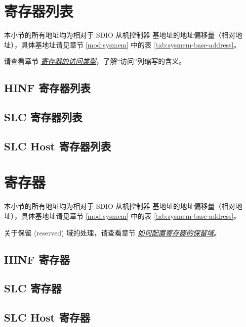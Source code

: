 \documentclass[main\_\_CN.tex]{subfiles}
\begin{document}
\section{寄存器列表}
\label{sec:sdioslave-reg-summ}

本小节的所有地址均为相对于 SDIO 从机控制器 基地址的地址偏移量（相对地址），具体基地址请见章节 \ref{mod:sysmem} \textit{} 中的表 \ref{tab:sysmem-base-address}。

请查看章节 \hyperref[glossary-access-types]{\textit{寄存器的访问类型}}，了解“访问”列缩写的含义。

\subsection{HINF 寄存器列表}
\label{sec:sdioslave-hinf-reg-summ}



\subsection{SLC 寄存器列表}
\label{sec:sdioslave-slc-reg-summ}



\subsection{SLC Host 寄存器列表}
\label{sec:sdioslave-slc-host-reg-summ}





\clearpage
\section{寄存器}

本小节的所有地址均为相对于 SDIO 从机控制器 基地址的地址偏移量（相对地址），具体基地址请见章节 \ref{mod:sysmem} \textit{} 中的表 \ref{tab:sysmem-base-address}。

关于保留 (reserved) 域的处理，请查看章节 \hyperref[programming-reserved-field]{\textit{如何配置寄存器的保留域}}。

\subsection{HINF 寄存器}
\label{sec:sdioslave-hinf-reg}



\subsection{SLC 寄存器}
\label{sec:sdioslave-slc-reg}



\subsection{SLC Host 寄存器}
\label{sec:sdioslave-slc-host-reg}


\end{document}
